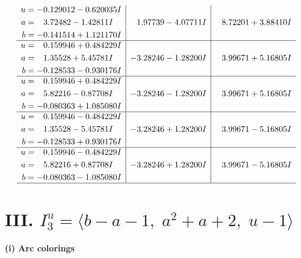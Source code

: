 \documentclass[1p]{elsarticle_modified}
\theoremstyle{definition}
\begin{document}
$$\begin{array}{c|c|c}
\begin{aligned}
u &= -0.129012 - 0.620035 I \\
a &= \phantom{-}3.72482 - 1.42811 I \\
b &= -0.141514 + 1.121170 I\end{aligned}
 & \phantom{-}1.97739 - 4.07711 I & \phantom{-}8.72201 + 3.88410 I \\ \hline\begin{aligned}
u &= \phantom{-}0.159946 + 0.484229 I \\
a &= \phantom{-}1.35528 + 5.45781 I \\
b &= -0.128533 - 0.930176 I\end{aligned}
 & -3.28246 - 1.28200 I & \phantom{-}3.99671 + 5.16805 I \\ \hline\begin{aligned}
u &= \phantom{-}0.159946 + 0.484229 I \\
a &= \phantom{-}5.82216 - 0.87708 I \\
b &= -0.080363 + 1.085080 I\end{aligned}
 & -3.28246 - 1.28200 I & \phantom{-}3.99671 + 5.16805 I \\ \hline\begin{aligned}
u &= \phantom{-}0.159946 - 0.484229 I \\
a &= \phantom{-}1.35528 - 5.45781 I \\
b &= -0.128533 + 0.930176 I\end{aligned}
 & -3.28246 + 1.28200 I & \phantom{-}3.99671 - 5.16805 I \\ \hline\begin{aligned}
u &= \phantom{-}0.159946 - 0.484229 I \\
a &= \phantom{-}5.82216 + 0.87708 I \\
b &= -0.080363 - 1.085080 I\end{aligned}
 & -3.28246 + 1.28200 I & \phantom{-}3.99671 - 5.16805 I\\
 \hline 
 \end{array}$$\newpage\newpage\renewcommand{\arraystretch}{1}
\centering \section*{III. $I^u_{3}= \langle b- a-1,\;a^2+a+2,\;u-1 \rangle$}
\flushleft \textbf{(i) Arc colorings}\\
\end{document}
